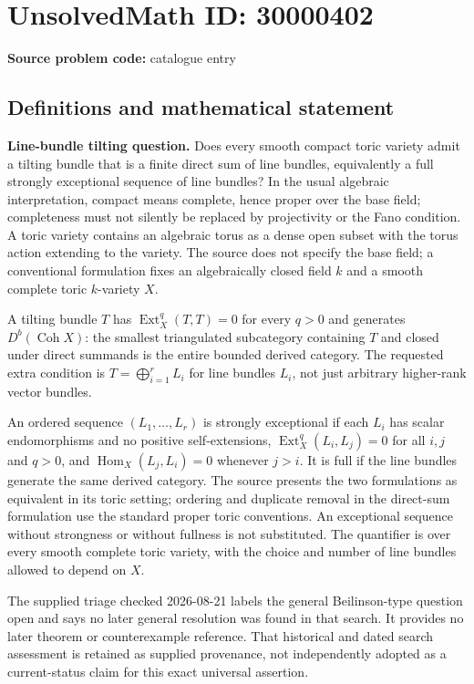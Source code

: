 \documentclass[11pt]{article}
\begin{document}
\section*{UnsolvedMath ID: 30000402}
\textbf{Source problem code:} catalogue entry
\subsection{Definitions and mathematical statement}
\textbf{Line-bundle tilting question.} Does every smooth compact toric variety admit a tilting bundle that is a finite direct sum of line bundles, equivalently a full strongly exceptional sequence of line bundles? In the usual algebraic interpretation, compact means complete, hence proper over the base field; completeness must not silently be replaced by projectivity or the Fano condition. A toric variety contains an algebraic torus as a dense open subset with the torus action extending to the variety. The source does not specify the base field; a conventional formulation fixes an algebraically closed field \(k\) and a smooth complete toric \(k\)-variety \(X\).\par A tilting bundle \(T\) has \(\operatorname{Ext}_X^q(T,T)=0\) for every \(q>0\) and generates \(D^b(\operatorname{Coh}X)\): the smallest triangulated subcategory containing \(T\) and closed under direct summands is the entire bounded derived category. The requested extra condition is \(T=\bigoplus_{i=1}^rL_i\) for line bundles \(L_i\), not just arbitrary higher-rank vector bundles.\par An ordered sequence \((L_1,\ldots,L_r)\) is strongly exceptional if each \(L_i\) has scalar endomorphisms and no positive self-extensions, \(\operatorname{Ext}_X^q(L_i,L_j)=0\) for all \(i,j\) and \(q>0\), and \(\operatorname{Hom}_X(L_j,L_i)=0\) whenever \(j>i\). It is full if the line bundles generate the same derived category. The source presents the two formulations as equivalent in its toric setting; ordering and duplicate removal in the direct-sum formulation use the standard proper toric conventions. An exceptional sequence without strongness or without fullness is not substituted. The quantifier is over every smooth complete toric variety, with the choice and number of line bundles allowed to depend on \(X\).\par The supplied triage checked 2026-08-21 labels the general Beilinson-type question open and says no later general resolution was found in that search. It provides no later theorem or counterexample reference. That historical and dated search assessment is retained as supplied provenance, not independently adopted as a current-status claim for this exact universal assertion.
\end{document}

